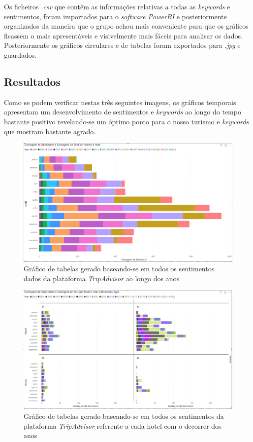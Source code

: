 Os ficheiros \textit{.csv} que contêm as informações relativas a todas as \textit{keywords} e sentimentos, foram importados para o \textit{software PowerBI} e posteriormente organizados da maneira que o grupo achou mais conveniente para que os gráficos ficassem o mais apresentáveis e visivelmente mais fáceis para analisar os dados. Posteriormente os gráficos circulares e de tabelas foram exportados para \textit{.jpg} e guardados. 

\subsection{Resultados}

Como se podem verificar nestas três seguintes imagens, os gráficos temporais apresentam um desenvolvimento de sentimentos e \textit{keywords} ao longo do tempo bastante positivo revelando-se um óptimo ponto para o nosso turismo e \textit{keywords} que mostram bastante agrado. 

\begin{figure}[!htb]
\centering
\includegraphics[width=16cm]{figuras/NrReviewsPerYear/TableGraph6.PNG}
\caption{Gráfico de tabelas gerado baseando-se em todos os sentimentos dados da plataforma \textit{TripAdvisor} ao longo dos anos}
\label{fig:exemplofigqntsntmyear}
\end{figure}

\begin{figure}[!htb]
\centering
\includegraphics[width=16cm]{figuras/NrReviewsPerYear&BusinessType/8.PNG}
\caption{Gráfico de tabelas gerado baseando-se em todos os sentimentos da plataforma \textit{TripAdvisor} referente a cada hotel com o decorrer dos anos}
\label{fig:exemplofigqntyearbus}
\end{figure}

